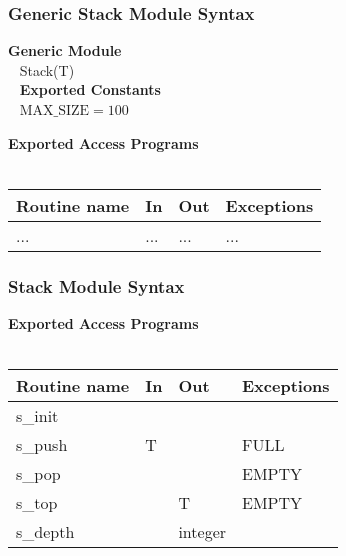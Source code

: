 \documentclass[t,12pt,numbers,fleqn,handout]{beamer}
\begin{document}

\begin{frame}
\frametitle{Generic Stack Module Syntax}

\textbf{Generic Module}\\
~\newline
Stack(T)\\
~\newline
\textbf{Exported Constants}\\
~\newline
$\mbox{MAX\_SIZE} = 100$
~\newline

\textbf{Exported Access Programs}\\
~\newline
\begin{tabular}{| l | l | l | l |}
\hline
\textbf{Routine name} & \textbf{In} & \textbf{Out} & \textbf{Exceptions}\\
\hline
... & ... & ... & ...\\
\hline
\end{tabular}

\end{frame}


\begin{frame}
\frametitle{Stack Module Syntax}

\textbf{Exported Access Programs}\\
~\newline
\begin{tabular}{| l | l | l | l |}
\hline
\textbf{Routine name} & \textbf{In} & \textbf{Out} & \textbf{Exceptions}\\
\hline
s\_init & ~ & ~ & ~\\
\hline
s\_push & T & ~ & FULL\\
\hline
s\_pop & ~ & ~ & EMPTY\\
\hline
s\_top & ~ & T & EMPTY\\
\hline
s\_depth & ~ & integer & ~\\
\hline
\end{tabular}

\end{frame}

\end{document}
